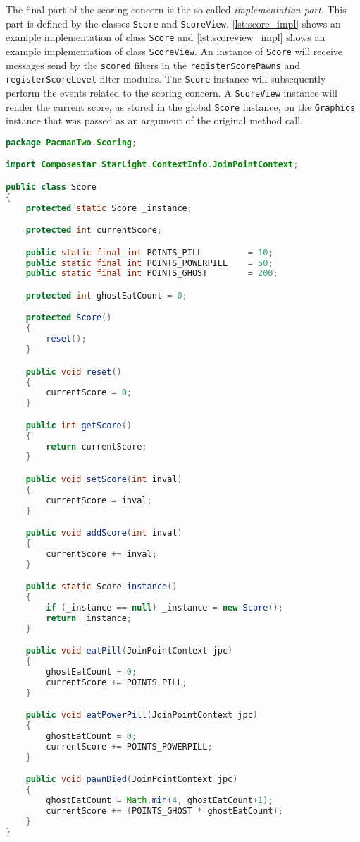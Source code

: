 The final part of the scoring concern is the so-called \emph{implementation part}.
This part is defined by the classes \lstinline|Score| and \lstinline|ScoreView|.
\autoref{lst:score_impl} shows an example implementation of class \lstinline|Score| and \autoref{lst:scoreview_impl} shows an example implementation of class \lstinline|ScoreView|.
An instance of \lstinline|Score| will receive messages send by the \lstinline|scored| filters in the \lstinline|registerScorePawns| and \lstinline|registerScoreLevel| filter modules. The \lstinline|Score| instance will subsequently perform the events related to the scoring concern.
A \lstinline|ScoreView| instance will render the current score, as stored in the global \lstinline|Score| instance, on the \lstinline|Graphics| instance that was passed as an argument of the original method call.

\begin{lstlisting}[style=floatlisting,language=Java,%
                   caption={Implementation of class \expandafter{\lstinline[style=inline]|Score|}},%
                   label={lst:score_impl}]
package PacmanTwo.Scoring;

import Composestar.StarLight.ContextInfo.JoinPointContext;

public class Score
{
	protected static Score _instance;

	protected int currentScore;

	public static final int POINTS_PILL			= 10;
	public static final int POINTS_POWERPILL	= 50;
	public static final int POINTS_GHOST		= 200;

	protected int ghostEatCount = 0;

	protected Score()
	{
		reset();
	}

	public void reset()
	{
		currentScore = 0;
	}

	public int getScore()
	{
		return currentScore;
	}

	public void setScore(int inval)
	{
		currentScore = inval;
	}

	public void addScore(int inval)
	{
		currentScore += inval;
	}

	public static Score instance()
	{
		if (_instance == null) _instance = new Score();
		return _instance;
	}

	public void eatPill(JoinPointContext jpc)
	{
		ghostEatCount = 0;
		currentScore += POINTS_PILL;
	}

	public void eatPowerPill(JoinPointContext jpc)
	{
		ghostEatCount = 0;
		currentScore += POINTS_POWERPILL;
	}

	public void pawnDied(JoinPointContext jpc)
	{
		ghostEatCount = Math.min(4, ghostEatCount+1);
		currentScore += (POINTS_GHOST * ghostEatCount);
	}
}
\end{lstlisting}

